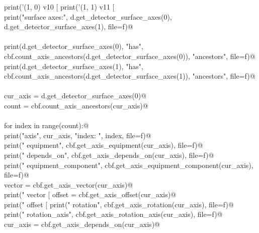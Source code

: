 \documentclass[10pt,a4paper,twoside,notitlepage]{article}
\begin{document}
\begin{flushleft}
\begin{minipage}{\linewidth}
\begin{list}{}{}
\mbox{}\verb@        print('(1, 0) v10 [ %.9g %.9g %.9g ]' %(round(v10[0],9), round(v10[1],9), round(v10[2],9)), file=f)@\\
\mbox{}\verb@        print('(1, 1) v11 [ %.9g %.9g %.9g ]' %(round(v11[0],9), round(v11[1],9), round(v11[2],9)), file=f)@\\
\mbox{}\verb@@\\
\mbox{}\verb@        print("surface axes:",  d.get_detector_surface_axes(0), d.get_detector_surface_axes(1), file=f)@\\
\mbox{}\verb@@\\
\mbox{}\verb@        print(d.get_detector_surface_axes(0), "has", cbf.count_axis_ancestors(d.get_detector_surface_axes(0)), "ancestors", file=f)@\\
\mbox{}\verb@        print(d.get_detector_surface_axes(1), "has", cbf.count_axis_ancestors(d.get_detector_surface_axes(1)), "ancestors", file=f)@\\
\mbox{}\verb@@\\
\mbox{}\verb@        cur_axis = d.get_detector_surface_axes(0)@\\
\mbox{}\verb@        count = cbf.count_axis_ancestors(cur_axis)@\\
\mbox{}\verb@@\\
\mbox{}\verb@        for index in range(count):@\\
\mbox{}\verb@            print("axis", cur_axis, "index: ", index, file=f)@\\
\mbox{}\verb@            print("    equipment", cbf.get_axis_equipment(cur_axis), file=f)@\\
\mbox{}\verb@            print("    depends_on", cbf.get_axis_depends_on(cur_axis), file=f)@\\
\mbox{}\verb@            print("    equipment_component", cbf.get_axis_equipment_component(cur_axis), file=f)@\\
\mbox{}\verb@            vector = cbf.get_axis_vector(cur_axis)@\\
\mbox{}\verb@            print("    vector [ %.8g %.8g %.8g ]" % (round(vector[0],7), round(vector[1],7), round(vector[2],7)), file=f)@\\
\mbox{}\verb@            offset = cbf.get_axis_offset(cur_axis)@\\
\mbox{}\verb@            print("    offset [ %.8g %.8g %.8g ]" % (round(offset[0],7), round(offset[1],7), round(offset[2],7)), file=f)@\\
\mbox{}\verb@            print("    rotation", cbf.get_axis_rotation(cur_axis), file=f)@\\
\mbox{}\verb@            print("    rotation_axis", cbf.get_axis_rotation_axis(cur_axis), file=f)@\\
\mbox{}\verb@            cur_axis = cbf.get_axis_depends_on(cur_axis)@\\
\mbox{}\verb@@{\NWsep}
\end{list}
\vspace{-1.5ex}
\footnotesize
\begin{list}{}{\setlength{\itemsep}{-\parsep}\setlength{\itemindent}{-\leftmargin}}


\end{list}
\end{minipage}
\end{flushleft}
\end{document}
